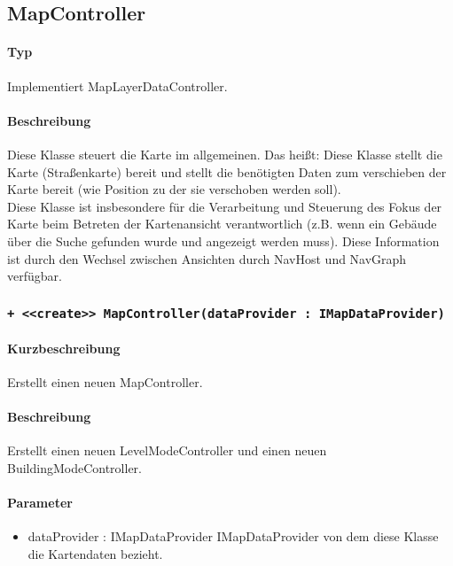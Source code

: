 \subsection{MapController}
\paragraph*{Typ}
Implementiert MapLayerDataController.
\paragraph*{Beschreibung}
Diese Klasse steuert die Karte im allgemeinen. Das heißt: Diese Klasse stellt die Karte (Straßenkarte) bereit 
und stellt die benötigten Daten zum verschieben der Karte bereit (wie Position zu der sie verschoben werden soll).\\
Diese Klasse ist insbesondere für die Verarbeitung und Steuerung des Fokus der Karte beim Betreten der 
Kartenansicht verantwortlich (z.B. wenn ein Gebäude über die Suche gefunden wurde und angezeigt werden muss).
Diese Information ist durch den Wechsel zwischen Ansichten durch NavHost und NavGraph verfügbar.

\subsubsection{\texttt{+ <<create>> MapController(dataProvider : IMapDataProvider)}}%
\paragraph*{Kurzbeschreibung}
Erstellt einen neuen MapController.
\paragraph*{Beschreibung}
Erstellt einen neuen LevelModeController und einen neuen BuildingModeController.
\paragraph*{Parameter}
\begin{itemize}
    \item dataProvider : IMapDataProvider IMapDataProvider von dem diese Klasse die Kartendaten bezieht.
\end{itemize}
